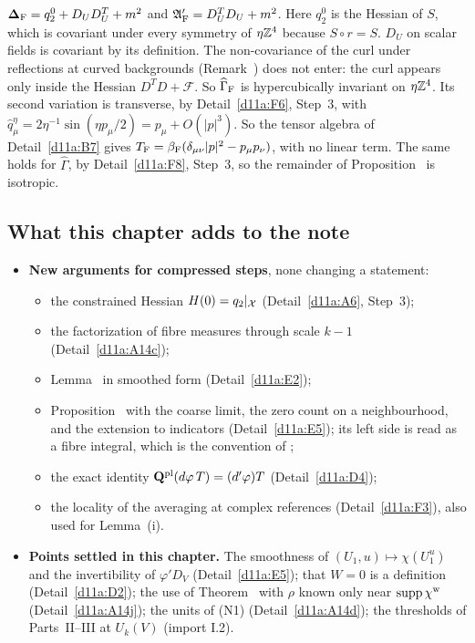 \begin{detail}\label{d11a:F16}
$\boldsymbol{\Delta}_{\rm F}=q_2^0+D_UD_U^T+m^2$ and $\mathfrak A'_{\rm F}=D_U^TD_U+m^2$. Here $q_2^0$ is the Hessian of $S$, which is covariant under every symmetry of $\eta\mathbb Z^4$ because $S\circ r=S$. $D_U$ on scalar fields is covariant by its definition. The non-covariance of the curl under reflections at curved backgrounds (Remark~) does not enter: the curl appears only inside the Hessian $D^TD+\mathcal F$. So $\widehat\Gamma_{\rm F}$ is hypercubically invariant on $\eta\mathbb Z^4$. Its second variation is transverse, by Detail~\ref{d11a:F6}, Step~3, with $\hat q^\eta_\mu=2\eta^{-1}\sin(\eta p_\mu/2)=p_\mu+O(|p|^3)$. So the tensor algebra of Detail~\ref{d11a:B7} gives $T_{\rm F}=\beta_{\rm F}(\delta_{\mu\nu}|p|^2-p_\mu p_\nu)$, with no linear term. The same holds for $\widehat\Gamma$, by Detail~\ref{d11a:F8}, Step~3, so the remainder of Proposition~ is isotropic.
\end{detail}

\subsection{What this chapter adds to the note}\label{d11a:findings}

\begin{itemize}
\item \textbf{New arguments for compressed steps}, none changing a statement:
  \begin{itemize}
  \item the constrained Hessian $H(0)=q_2|_\mathcal X$ (Detail~\ref{d11a:A6}, Step~3);
  \item the factorization of fibre measures through scale $k-1$ (Detail~\ref{d11a:A14c});
  \item Lemma~ in smoothed form (Detail~\ref{d11a:E2});
  \item Proposition~ with the coarse limit, the zero count on a neighbourhood, and the extension to indicators (Detail~\ref{d11a:E5}); its left side is read as a fibre integral, which is the convention of ;
  \item the exact identity $\mathbf Q^{\rm pl}(d\varphi\,T)=(d'\varphi)T$ (Detail~\ref{d11a:D4});
  \item the locality of the averaging at complex references (Detail~\ref{d11a:F3}), also used for Lemma~(i).
  \end{itemize}
\item \textbf{Points settled in this chapter.} The smoothness of $(U_1,u)\mapsto\chi(U_1^u)$ and the invertibility of $\varphi'D_V$ (Detail~\ref{d11a:E5}); that $W=0$ is a definition (Detail~\ref{d11a:D2}); the use of Theorem~ with $\rho$ known only near $\operatorname{supp}\chi^{\rm w}$ (Detail~\ref{d11a:A14j}); the units of (N1) (Detail~\ref{d11a:A14d}); the thresholds of Parts~II--III at $U_k(V)$ (import I.2).
\end{itemize}
